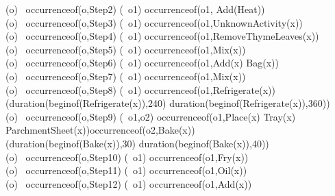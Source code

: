 \begin{center}
(\forall o) \ occurrence\textunderscore of(o,Step2) \supset (\exists\, o1) \land occurrence\textunderscore of(o1, Add(Heat)) \\

(\forall o) \ occurrence\textunderscore of(o,Step3) \supset (\exists\, o1) \land occurrence\textunderscore of(o1,Unknown\textunderscore Activity(x)) \\

(\forall o) \ occurrence\textunderscore of(o,Step4) \supset (\exists\, o1) \land occurrence\textunderscore of(o1,RemoveThymeLeaves(x)) \\

(\forall o) \ occurrence\textunderscore of(o,Step5) \supset (\exists\, o1) \land occurrence\textunderscore of(o1,Mix(x)) \\

(\forall o) \ occurrence\textunderscore of(o,Step6) \supset (\exists\, o1) \land occurrence\textunderscore of(o1,Add(x) \land Bag(x)) \\

(\forall o) \ occurrence\textunderscore of(o,Step7) \supset (\exists\, o1) \land occurrence\textunderscore of(o1,Mix(x)) \\

(\forall o) \ occurrence\textunderscore of(o,Step8) \supset (\exists\, o1) \land occurrence\textunderscore of(o1,Refrigerate(x)) \land (duration(beginof(Refrigerate(x)),240) \lor duration(beginof(Refrigerate(x)),360)) \\

(\forall o) \ occurrence\textunderscore of(o,Step9) \supset (\exists\, o1,o2) \land occurrence\textunderscore of(o1,Place(x) \land Tray(x) \land ParchmentSheet(x))\land occurrence\textunderscore of(o2,Bake(x)) \land \\ (duration(beginof(Bake(x)),30) \lor duration(beginof(Bake(x)),40)) \\

(\forall o) \ occurrence\textunderscore of(o,Step10) \supset (\exists\, o1) \land occurrence\textunderscore of(o1,Fry(x)) \\

(\forall o) \ occurrence\textunderscore of(o,Step11) \supset (\exists\, o1) \land occurrence\textunderscore of(o1,Oil(x)) \\

(\forall o) \ occurrence\textunderscore of(o,Step12) \supset (\exists\, o1) \land occurrence\textunderscore of(o1,Add(x)) \\


\end{center}
